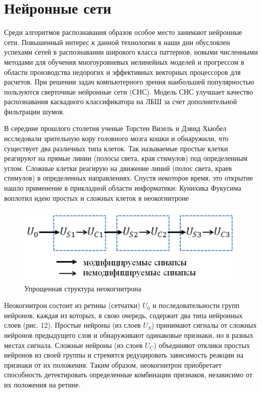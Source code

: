 \newpage
\section{Нейронные сети}

Среди алгоритмов распознавания образов особое место занимают нейронные сети. Повышенный интерес к данной технологии в наши дни обусловлен успехами сетей в распознавании широкого класса паттернов, новыми численными методами для обучения многоуровневых нелинейных моделей и прогрессом в области производства недорогих и эффективных векторных процессоров для расчетов. При решении задач компьютерного зрения наибольшей популярностью пользуются сверточные нейронные сети (СНС). Модель СНС улучшает качество распознавания каскадного классификатора на ЛБШ за счет дополнительной фильтрации шумов.

В середине прошлого столетия ученые Торстен Визель и Дэвид Хьюбел исследовали зрительную кору головного мозга кошки и обнаружили, что существует два различных типа клеток. Так называемые простые клетки реагируют на прямые линии (полосы света, края стимулов) под определенным углом. Сложные клетки реагирую на движение линий (полос света, краев стимулов) в определенных направлениях. Спустя некоторое время, это открытие нашло применение в прикладной области информатики: Кунихика Фукусима воплотил идею простых и сложных клеток в неокогнитроне

\begin{figure}[h!]
\centering
\includegraphics[scale=0.5]{res/pic012}
\caption{Упрощенная структура неокогнитрона}
\end{figure}

Неокогнитрон состоит из ретины (сетчатки) $U_0$ и последовательности групп нейронов, каждая из которых, в свою очередь, содержит два типа нейронных слоев (рис. 12). Простые нейроны (из слоев $U_S$) принимают сигналы от сложных нейронов предыдущего слоя и обнаруживают одинаковые признаки, но в разных местах сигнала. Сложные нейроны (из слоев $U_C$) объединяют отклики простых нейронов из своей группы и стремятся редуцировать зависимость реакции на признаки от их положения. Таким образом, неокогнитрон приобретает способность детектировать определенные комбинации признаков, независимо от их положения на ретине.

